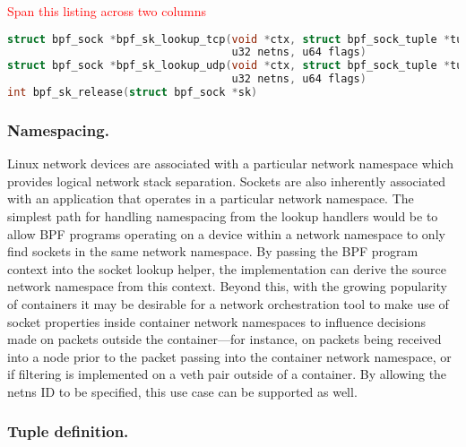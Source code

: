 \documentclass[10pt,sigconf,authorversion]{lpc}
\newcommand\todo[1]{\textcolor{red}{#1}}
\begin{document}
\todo{Span this listing across two columns}
\begin{lstlisting}[caption={BPF API helper functions for socket lookup},language=c,label=lst:helper-api,breaklines=true]
struct bpf_sock *bpf_sk_lookup_tcp(void *ctx, struct bpf_sock_tuple *tuple, u32 tuple_size,
                                   u32 netns, u64 flags)
struct bpf_sock *bpf_sk_lookup_udp(void *ctx, struct bpf_sock_tuple *tuple, u32 tuple_size,
                                   u32 netns, u64 flags)
int bpf_sk_release(struct bpf_sock *sk)
\end{lstlisting}

\subsubsection{Namespacing.}

Linux network devices are associated with a particular network namespace which
provides logical network stack separation. Sockets are also inherently
associated with an application that operates in a particular network namespace.
The simplest path for handling namespacing from the lookup handlers would be to
allow BPF programs operating on a device within a network namespace to only
find sockets in the same network namespace. By passing the BPF program context
into the socket lookup helper, the implementation can derive the source network
namespace from this context. Beyond this, with the growing popularity of
containers it may be desirable for a network orchestration tool to make use of
socket properties inside container network namespaces to influence decisions
made on packets outside the container---for instance, on packets being received
into a node prior to the packet passing into the container network namespace,
or if filtering is implemented on a veth pair outside of a container. By
allowing the netns ID to be specified, this use case can be supported as well.

\subsubsection{Tuple definition.}
\end{document}
